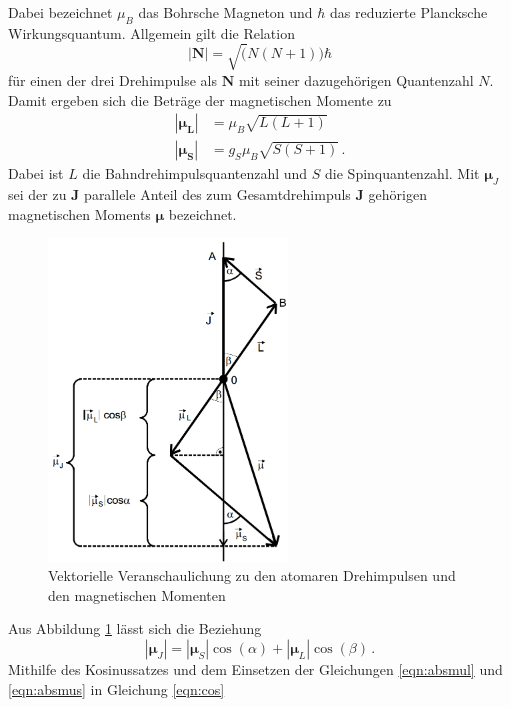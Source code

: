 Dabei bezeichnet $\mu_B$ das Bohrsche Magneton und $\hbar$ das reduzierte Plancksche
Wirkungsquantum.
Allgemein gilt die Relation
\begin{equation}
  |\symbf{N}| = \sqrt(N(N+1)) \hbar
\end{equation}
für einen der drei Drehimpulse als $\symbf{N}$ mit seiner dazugehörigen Quantenzahl
$N$. Damit ergeben sich die Beträge der magnetischen Momente zu
\begin{align}
  |\symbf{\mu_L}| &= \mu_B \sqrt{L(L+1)} \, \label{eqn:absmul}\\
  |\symbf{\mu_S}| &= g_S \mu_B \sqrt{S(S+1)} \, \label{eqn:absmus}.
  \label{eqn:absmulmus}
\end{align}
Dabei ist $L$ die Bahndrehimpulsquantenzahl und $S$ die Spinquantenzahl.
Mit $\symbf{\mu}_J$ sei der zu $\symbf{J}$ parallele Anteil des zum Gesamtdrehimpuls $\symbf{J}$
gehörigen magnetischen Moments $\symbf{\mu}$ bezeichnet.

\begin{figure}
  \centering
  \includegraphics[width=180pt]{data/drehimpulse.png}
  \caption{Vektorielle Veranschaulichung zu den atomaren Drehimpulsen und den magnetischen Momenten \cite{Versuchsanleitung}}
  \label{fig:vektordreh}
\end{figure}

Aus Abbildung \ref{fig:vektordreh} lässt sich die Beziehung
\begin{equation}
  |\symbf{\mu}_J| = |\symbf{\mu}_S| \cos(\alpha) + |\symbf{\mu}_L| \cos(\beta)\,.
  \label{eqn:cos}
\end{equation}
Mithilfe des Kosinussatzes und dem Einsetzen der Gleichungen \ref{eqn:absmul} und \ref{eqn:absmus} in Gleichung
\ref{eqn:cos}
